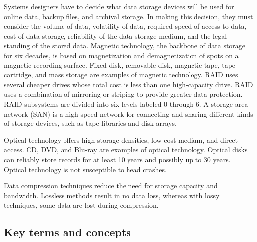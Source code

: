 \documentclass[
]{article}
\begin{document}
Systems designers have to decide what data storage devices will be used
for online data, backup files, and archival storage. In making this
decision, they must consider the volume of data, volatility of data,
required speed of access to data, cost of data storage, reliability of
the data storage medium, and the legal standing of the stored data.
Magnetic technology, the backbone of data storage for six decades, is
based on magnetization and demagnetization of spots on a magnetic
recording surface. Fixed disk, removable disk, magnetic tape, tape
cartridge, and mass storage are examples of magnetic technology. RAID
uses several cheaper drives whose total cost is less than one
high-capacity drive. RAID uses a combination of mirroring or striping to
provide greater data protection. RAID subsystems are divided into six
levels labeled 0 through 6. A storage-area network (SAN) is a high-speed
network for connecting and sharing different kinds of storage devices,
such as tape libraries and disk arrays.

Optical technology offers high storage densities, low-cost medium, and
direct access. CD, DVD, and Blu-ray are examples of optical technology.
Optical disks can reliably store records for at least 10 years and
possibly up to 30 years. Optical technology is not susceptible to head
crashes.

Data compression techniques reduce the need for storage capacity and
bandwidth. Lossless methods result in no data loss, whereas with lossy
techniques, some data are lost during compression.

\hypertarget{key-terms-and-concepts-8}{%
\subsection*{Key terms and concepts}\label{key-terms-and-concepts-8}}
\end{document}
